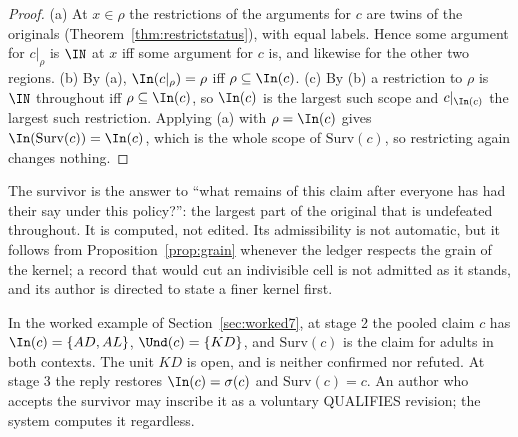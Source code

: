 \begin{proof}
(a) At $x\in\rho$ the restrictions of the arguments for $c$ are twins of the originals (Theorem~\ref{thm:restrictstatus}), with equal labels. Hence some argument for $c|_\rho$ is $\IN$ at $x$ iff some argument for $c$ is, and likewise for the other two regions. (b) By (a), $\In(c|_\rho)=\rho$ iff $\rho\subseteq\In(c)$. (c) By (b) a restriction to $\rho$ is $\IN$ throughout iff $\rho\subseteq\In(c)$, so $\In(c)$ is the largest such scope and $c|_{\In(c)}$ the largest such restriction. Applying (a) with $\rho=\In(c)$ gives $\In(\mathrm{Surv}(c))=\In(c)$, which is the whole scope of $\mathrm{Surv}(c)$, so restricting again changes nothing.
\end{proof}

The survivor is the answer to ``what remains of this claim after everyone has had their say under this policy?'': the largest part of the original that is undefeated throughout. It is computed, not edited. Its admissibility is not automatic, but it follows from Proposition~\ref{prop:grain} whenever the ledger respects the grain of the kernel; a record that would cut an indivisible cell is not admitted as it stands, and its author is directed to state a finer kernel first.

\begin{example}
In the worked example of Section~\ref{sec:worked7}, at stage 2 the pooled claim $c$ has $\In(c)=\{AD,AL\}$, $\Und(c)=\{KD\}$, and $\mathrm{Surv}(c)$ is the claim for adults in both contexts. The unit $KD$ is open, and is neither confirmed nor refuted. At stage 3 the reply restores $\In(c)=\sigma(c)$ and $\mathrm{Surv}(c)=c$. An author who accepts the survivor may inscribe it as a voluntary \textsf{QUALIFIES} revision; the system computes it regardless.
\end{example}

